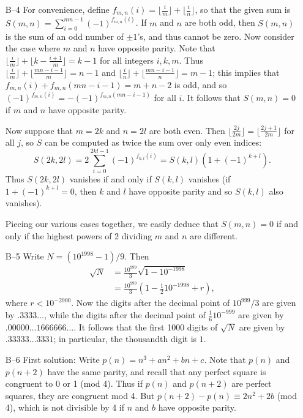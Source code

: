 \documentclass[amssymb,twocolumn,pra,10pt,aps]{revtex4-1}
\begin{document}
\begin{itemize}
\item[B--4]
For convenience, define $f_{m,n}(i) = \lfloor \frac{i}{m} \rfloor +
\lfloor \frac{i}{n} \rfloor$, so that the given sum is
$S(m,n) = \sum_{i=0}^{mn-1} (-1)^{f_{m,n}(i)}$.
If $m$ and $n$ are both odd, then $S(m,n)$ is the sum of
an odd number of $\pm 1$'s, and thus cannot be zero.  Now consider
the case where $m$ and $n$ have opposite parity.  Note that
$\lfloor \frac{i}{m} \rfloor + \lfloor k - \frac{i+1}{m} \rfloor
= k-1$ for all integers $i,k,m$.  Thus
$\lfloor \frac{i}{m} \rfloor + \lfloor \frac{mn-i-1}{m} \rfloor
= n-1$ and $\lfloor \frac{i}{n} \rfloor + \lfloor \frac{mn-i-1}{n}
\rfloor = m-1$; this implies that $f_{m,n}(i) + f_{m,n}(mn-i-1) =
m+n-2$ is odd, and so $(-1)^{f_{m,n}(i)} =
-(-1)^{f_{m,n}(mn-i-1)}$ for
all $i$.  It follows that $S(m,n) = 0$ if $m$ and
$n$ have opposite parity.

Now suppose that $m=2k$ and $n=2l$ are both even.
Then $\lfloor \frac{2j}{2m} \rfloor = \lfloor \frac{2j+1}{2m} \rfloor$
for all $j$, so $S$ can be computed as twice the sum over only even
indices:
\[
S(2k, 2l) = 2 \sum_{i=0}^{2kl-1} (-1)^{f_{k,l}(i)}
= S(k,l)(1 + (-1)^{k+l}).
\]
Thus $S(2k,2l)$ vanishes if and only if $S(k,l)$ vanishes (if $1 +
(-1)^{k+l} = 0$, then $k$ and $l$ have opposite parity and so
$S(k,l)$ also vanishes).

Piecing our various cases together, we easily deduce that
$S(m,n) = 0$ if and only if the highest powers of 2 dividing
$m$ and $n$ are different.

\item[B--5]
Write $N=(10^{1998}-1)/9$.  Then
\begin{align*}
\sqrt{N} &=\frac{10^{999}}{3}\sqrt{1-10^{-1998}} \\
&=\frac{10^{999}}{3}
(1-\frac{1}{2}10^{-1998} + r),
\end{align*}
where $r<10^{-2000}$.  Now the digits after the decimal point of
$10^{999}/3$ are given by $.3333\ldots$, while
the digits after the decimal point
of $\frac{1}{6}10^{-999}$ are given by $.00000\ldots 1666666\ldots$.
It follows that the first 1000 digits of $\sqrt N$ are given
by $.33333\ldots 3331$;  in particular, the thousandth digit is $1$.

\item[B--6]
First solution: Write $p(n) = n^3 + an^2 + bn + c$. Note that $p(n)$
and $p(n+2)$ have the same parity, and recall that any perfect square
is congruent to 0 or 1 (mod 4). Thus if $p(n)$ and $p(n+2)$ are perfect
squares, they are congruent mod 4. But $p(n+2) - p(n) \equiv 2n^2 + 2b$
(mod 4), which is not divisible by 4 if $n$ and $b$ have opposite parity.
%


\end{itemize}
\end{document}
